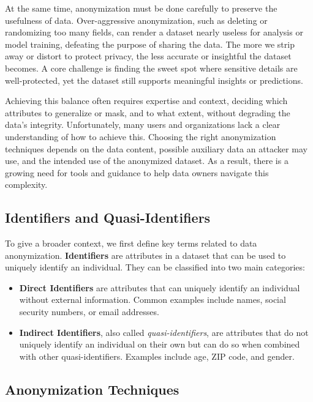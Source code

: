 \documentclass{article}
\begin{document}
At the same time, anonymization must be done carefully to preserve the usefulness of data. Over-aggressive anonymization, such as deleting or randomizing too many fields, can render a dataset nearly useless for analysis or model training, defeating the purpose of sharing the data. The more we strip away or distort to protect privacy, the less accurate or insightful the dataset becomes. A core challenge is finding the sweet spot where sensitive details are well-protected, yet the dataset still supports meaningful insights or predictions.

Achieving this balance often requires expertise and context, deciding which attributes to generalize or mask, and to what extent, without degrading the data’s integrity. Unfortunately, many users and organizations lack a clear understanding of how to achieve this. Choosing the right anonymization techniques depends on the data content, possible auxiliary data an attacker may use, and the intended use of the anonymized dataset. As a result, there is a growing need for tools and guidance to help data owners navigate this complexity.



\subsection{Identifiers and Quasi-Identifiers}

To give a broader context, we first define key terms related to data anonymization.
\textbf{Identifiers} are attributes in a dataset that can be used to uniquely identify an individual. They can be classified into two main categories:

\begin{itemize}
\item \textbf{Direct Identifiers} are attributes that can uniquely identify an individual without external information. Common examples include names, social security numbers, or email addresses.

\item \textbf{Indirect Identifiers}, also called \textit{quasi-identifiers}, are attributes that do not uniquely identify an individual on their own but can do so when combined with other quasi-identifiers. Examples include age, ZIP code, and gender.
\end{itemize}




\subsection{Anonymization Techniques}
\end{document}
